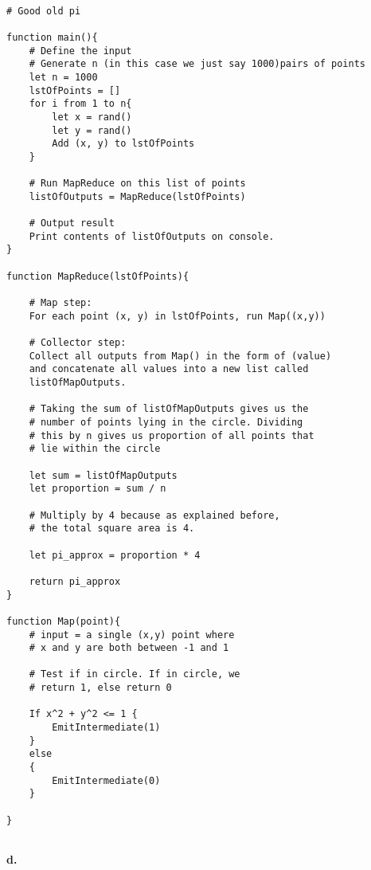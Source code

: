 \documentclass[12 pt]{article}
\begin{document}
	\begin{lstlisting}
	
# Good old pi

function main(){
	# Define the input
	# Generate n (in this case we just say 1000)pairs of points
	let n = 1000
	lstOfPoints = []
	for i from 1 to n{
		let x = rand()
		let y = rand()
		Add (x, y) to lstOfPoints
	}
	
	# Run MapReduce on this list of points
	listOfOutputs = MapReduce(lstOfPoints)
	
	# Output result
	Print contents of listOfOutputs on console.
}

function MapReduce(lstOfPoints){

	# Map step:
	For each point (x, y) in lstOfPoints, run Map((x,y))
	
	# Collector step:
	Collect all outputs from Map() in the form of (value)
	and concatenate all values into a new list called 
	listOfMapOutputs.

	# Taking the sum of listOfMapOutputs gives us the 
	# number of points lying in the circle. Dividing
	# this by n gives us proportion of all points that 
	# lie within the circle
	
	let sum = listOfMapOutputs
	let proportion = sum / n
	
	# Multiply by 4 because as explained before,
	# the total square area is 4.
	
	let pi_approx = proportion * 4
	
	return pi_approx
}

function Map(point){
	# input = a single (x,y) point where
	# x and y are both between -1 and 1
	
	# Test if in circle. If in circle, we
	# return 1, else return 0
	
	If x^2 + y^2 <= 1 {
		EmitIntermediate(1)
	}
	else
	{
		EmitIntermediate(0)
	}

}
	
	\end{lstlisting}
	
	\noindent \textbf{d.} 
	
\end{document}
